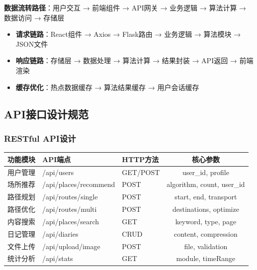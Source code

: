 \documentclass[12pt,a4paper]{article}
\begin{document}
\begin{warningbox}[title={端到端数据流转设计}]
\textbf{数据流转路径}：用户交互 → 前端组件 → API网关 → 业务逻辑 → 算法计算 → 数据访问 → 存储层
\begin{itemize}[nosep]
    \item \textbf{请求链路}：React组件 → Axios → Flask路由 → 业务逻辑 → 算法模块 → JSON文件
    \item \textbf{响应链路}：存储层 → 数据处理 → 算法计算 → 结果封装 → API返回 → 前端渲染
    \item \textbf{缓存优化}：热点数据缓存 → 算法结果缓存 → 用户会话缓存
\end{itemize}
\end{warningbox}

\subsection{API接口设计规范}

\subsubsection{RESTful API设计}

\begin{table}[H]
\centering
\begin{tcolorbox}[
    colback=light,
    colframe=primary,
    title={\textbf{核心API接口设计}},
    coltitle=white,
    colbacktitle=primary,
    fonttitle=\bfseries,
    rounded corners=5pt,
    width=0.95\textwidth
]
\begin{tabular}{lllc}
\toprule
\rowcolor{primary!20}
\textbf{功能模块} & \textbf{API端点} & \textbf{HTTP方法} & \textbf{核心参数} \\
\midrule
用户管理 & /api/users & GET/POST & user\_id, profile \\
\rowcolor{light}
场所推荐 & /api/places/recommend & POST & algorithm, count, user\_id \\
路径规划 & /api/routes/single & POST & start, end, transport \\
\rowcolor{light}
路径优化 & /api/routes/multi & POST & destinations, optimize \\
内容搜索 & /api/places/search & GET & keyword, type, page \\
\rowcolor{light}
日记管理 & /api/diaries & CRUD & content, compression \\
文件上传 & /api/upload/image & POST & file, validation \\
\rowcolor{light}
统计分析 & /api/stats & GET & module, timeRange \\
\bottomrule
\end{tabular}
\end{tcolorbox}
\end{table}
\end{document}
